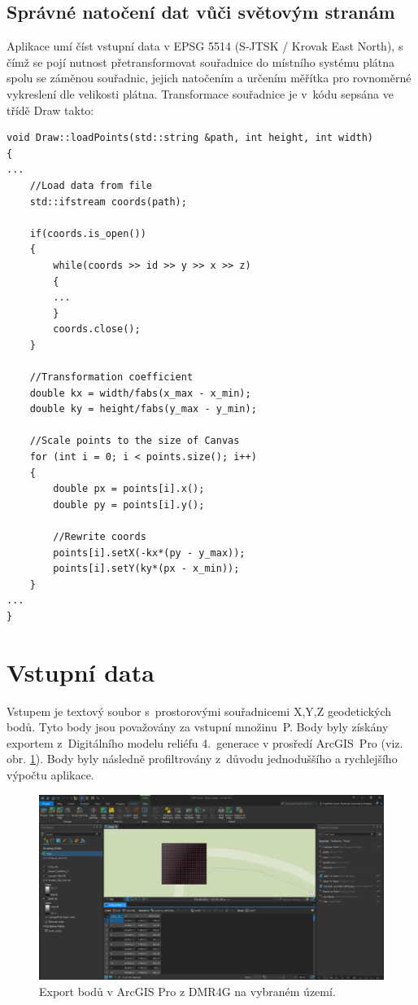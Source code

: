 \documentclass[a4paper, 12pt, oneside, titlepage]{article} %
\begin{document}
\subsection{Správné natočení dat vůči světovým stranám}
Aplikace umí číst vstupní data v EPSG 5514 (S-JTSK / Krovak East North), s čímž se pojí nutnost přetransformovat souřadnice do místního systému plátna spolu se záměnou souřadnic, jejich natočením a určením měřítka pro rovnoměrné vykreslení dle velikosti plátna. Transformace souřadnice je v~kódu sepsána ve třídě Draw takto: 

\begin{verbatim}
void Draw::loadPoints(std::string &path, int height, int width)
{
...
    //Load data from file
    std::ifstream coords(path);

    if(coords.is_open())
    {
        while(coords >> id >> y >> x >> z)
        {
        ...
        }
        coords.close();
    }

    //Transformation coefficient
    double kx = width/fabs(x_max - x_min);
    double ky = height/fabs(y_max - y_min);

    //Scale points to the size of Canvas
    for (int i = 0; i < points.size(); i++)
    {
        double px = points[i].x();
        double py = points[i].y();

        //Rewrite coords
        points[i].setX(-kx*(py - y_max));
        points[i].setY(ky*(px - x_min));
    }
...
}
\end{verbatim}


\section{Vstupní data}
Vstupem je textový soubor s~prostorovými souřadnicemi X,Y,Z geodetických bodů. Tyto body jsou považovány za vstupní množinu~P. Body byly získány exportem z~Digitálního modelu reliéfu 4.~generace \cite{ZABAGED} v prosředí ArcGIS~Pro \cite{arcgispro} (viz. obr. \ref{fig:arcgis_body}). Body byly následně profiltrovány z~důvodu jednoduššího a rychlejšího výpočtu aplikace.

\begin{figure}[!htb]
	\centering
	\includegraphics[scale=0.33]{obrazky/arcgis_body.png} 
	\caption{Export bodů v ArcGIS Pro z DMR4G na vybraném území.
	}
	\label{fig:arcgis_body}
\end{figure} 
\FloatBarrier
\end{document}
